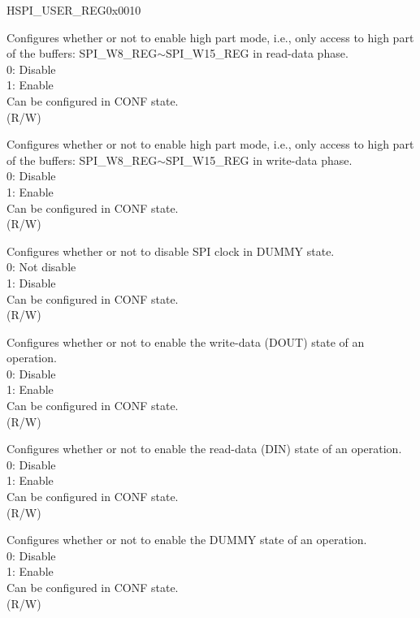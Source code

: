 \begin{register}{H}{SPI\_USER\_REG}{0x0010}
\begin{regdesc}
\begin{reglist}
\label{fielddesc:SPIUSRMISOHIGHPART}\item [SPI\_USR\_MISO\_HIGHPART] Configures whether or not to enable high part mode, i.e., only access to high part of the buffers: SPI\_W8\_REG$\sim$SPI\_W15\_REG in read-data phase. \\
0: Disable \\
1: Enable \\
Can be configured in CONF state. \\ (R/W)
\label{fielddesc:SPIUSRMOSIHIGHPART}\item [SPI\_USR\_MOSI\_HIGHPART] Configures whether or not to enable high part mode, i.e., only access to high part of the buffers: SPI\_W8\_REG$\sim$SPI\_W15\_REG in write-data phase. \\
0: Disable \\
1: Enable \\
Can be configured in CONF state. \\ (R/W)
\label{fielddesc:SPIUSRDUMMYIDLE}\item [SPI\_USR\_DUMMY\_IDLE] Configures whether or not to disable SPI clock in DUMMY state. \\
0: Not disable \\
1: Disable \\
Can be configured in CONF state. \\ (R/W)
\label{fielddesc:SPIUSRMOSI}\item [SPI\_USR\_MOSI] Configures whether or not to enable the write-data (DOUT) state of an operation. \\
0: Disable \\
1: Enable \\
Can be configured in CONF state. \\ (R/W)
\label{fielddesc:SPIUSRMISO}\item [SPI\_USR\_MISO] Configures whether or not to enable the read-data (DIN) state of an operation. \\
0: Disable \\
1: Enable \\
Can be configured in CONF state. \\ (R/W)
\label{fielddesc:SPIUSRDUMMY}\item [SPI\_USR\_DUMMY] Configures whether or not to enable the DUMMY state of an operation. \\
0: Disable \\
1: Enable \\
Can be configured in CONF state. \\ (R/W)


\end{reglist}
\end{regdesc}
\end{register}
